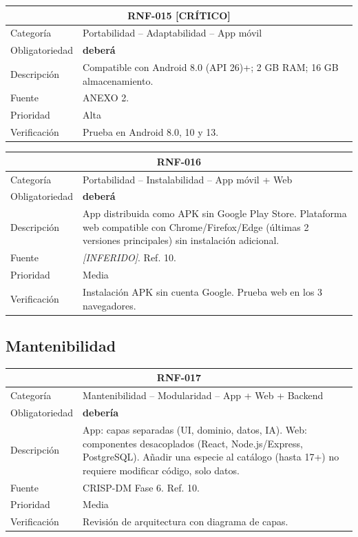 \documentclass[12pt, a4paper]{article}
\newcommand{\criticomark}{\textcolor{criticolor}{\textbf{[CR\'ITICO]}}}
\newcommand{\inferido}{\textcolor{medio}{\textit{[INFERIDO]}}}
\begin{document}
\begin{longtable}{|p{3cm}|p{11.5cm}|}
\hline
\multicolumn{2}{|c|}{\textbf{RNF-015} \criticomark} \\
\hline
Categor\'ia & Portabilidad -- Adaptabilidad -- App m\'ovil \\
\hline
Obligatoriedad & \textbf{deber\'a} \\
\hline
Descripci\'on & Compatible con Android 8.0 (API 26)+; 2 GB RAM; 16 GB almacenamiento. \\
\hline
Fuente & ANEXO 2. \\
\hline
Prioridad & Alta \\
\hline
Verificaci\'on & Prueba en Android 8.0, 10 y 13. \\
\hline
\end{longtable}

\begin{longtable}{|p{3cm}|p{11.5cm}|}
\hline
\multicolumn{2}{|c|}{\textbf{RNF-016}} \\
\hline
Categor\'ia & Portabilidad -- Instalabilidad -- App m\'ovil + Web \\
\hline
Obligatoriedad & \textbf{deber\'a} \\
\hline
Descripci\'on & App distribuida como APK sin Google Play Store. Plataforma web compatible con Chrome/Firefox/Edge (\'ultimas 2 versiones principales) sin instalaci\'on adicional. \\
\hline
Fuente & \inferido{}. Ref. 10. \\
\hline
Prioridad & Media \\
\hline
Verificaci\'on & Instalaci\'on APK sin cuenta Google. Prueba web en los 3 navegadores. \\
\hline
\end{longtable}

\subsection{Mantenibilidad}

\begin{longtable}{|p{3cm}|p{11.5cm}|}
\hline
\multicolumn{2}{|c|}{\textbf{RNF-017}} \\
\hline
Categor\'ia & Mantenibilidad -- Modularidad -- App + Web + Backend \\
\hline
Obligatoriedad & \textbf{deber\'ia} \\
\hline
Descripci\'on & App: capas separadas (UI, dominio, datos, IA). Web: componentes desacoplados (React, Node.js/Express, PostgreSQL). A\~nadir una especie al cat\'alogo (hasta 17+) no requiere modificar c\'odigo, solo datos. \\
\hline
Fuente & CRISP-DM Fase 6. Ref. 10. \\
\hline
Prioridad & Media \\
\hline
Verificaci\'on & Revisi\'on de arquitectura con diagrama de capas. \\
\hline
\end{longtable}
\end{document}
